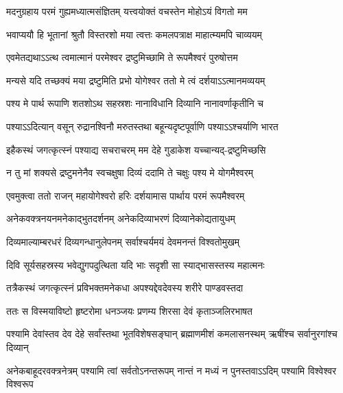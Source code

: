 \twolineshloka
{मदनुग्रहाय परमं गुह्यमध्यात्मसंज्ञितम्}
{यत्त्वयोक्तं वचस्तेन मोहोऽयं विगतो मम}%

\twolineshloka
{भवाप्ययौ हि भूतानां श्रुतौ विस्तरशो मया}
{त्वत्तः कमलपत्राक्ष माहात्म्यमपि चाव्ययम्}%

\twolineshloka
{एवमेतद्यथाऽऽत्थ त्वमात्मानं परमेश्वर}
{द्रष्टुमिच्छामि ते रूपमैश्वरं पुरुषोत्तम}%

\twolineshloka
{मन्यसे यदि तच्छक्यं मया द्रष्टुमिति प्रभो}
{योगेश्वर ततो मे त्वं दर्शयाऽऽत्मानमव्ययम्}%

\twolineshloka
{पश्य मे पार्थ रूपाणि शतशोऽथ सहस्रशः}
{नानाविधानि दिव्यानि नानावर्णाकृतीनि च}%

\twolineshloka
{पश्याऽऽदित्यान् वसून् रुद्रानश्विनौ मरुतस्तथा}
{बहून्यदृष्टपूर्वाणि पश्याऽऽश्चर्याणि भारत}%

\twolineshloka
{इहैकस्थं जगत्कृत्स्नं पश्याद्य सचराचरम्}
{मम देहे गुडाकेश यच्चान्यद्-द्रष्टुमिच्छसि}%

\twolineshloka
{न तु मां शक्यसे द्रष्टुमनेनैव स्वचक्षुषा}
{दिव्यं ददामि ते चक्षुः पश्य मे योगमैश्वरम्}%

\twolineshloka
{एवमुक्त्वा ततो राजन् महायोगेश्वरो हरिः}
{दर्शयामास पार्थाय परमं रूपमैश्वरम्}%

\twolineshloka
{अनेकवक्त्रनयनमनेकाद्भुतदर्शनम्}
{अनेकदिव्याभरणं दिव्यानेकोद्यतायुधम्}%

\twolineshloka
{दिव्यमाल्याम्बरधरं दिव्यगन्धानुलेपनम्}
{सर्वाश्चर्यमयं देवमनन्तं विश्वतोमुखम्}%

\twolineshloka
{दिवि सूर्यसहस्रस्य भवेद्युगपदुत्थिता}
{यदि भाः सदृशी सा स्याद्भासस्तस्य महात्मनः}%

\twolineshloka
{तत्रैकस्थं जगत्कृत्स्नं प्रविभक्तमनेकधा}
{अपश्यद्देवदेवस्य शरीरे पाण्डवस्तदा}%

\twolineshloka
{ततः स विस्मयाविष्टो हृष्टरोमा धनञ्जयः}
{प्रणम्य शिरसा देवं कृताञ्जलिरभाषत}%

\fourlineindentedshloka
{पश्यामि देवांस्तव देव देहे}
{सर्वांस्तथा भूतविशेषसङ्घान्}
{ब्रह्माणमीशं कमलासनस्थम्}
{ऋषींश्च सर्वानुरगांश्च दिव्यान्}%

\fourlineindentedshloka
{अनेकबाहूदरवक्त्रनेत्रम्}
{पश्यामि त्वां सर्वतोऽनन्तरूपम्}
{नान्तं न मध्यं न पुनस्तवाऽऽदिम्}
{पश्यामि विश्वेश्वर विश्वरूप}%

